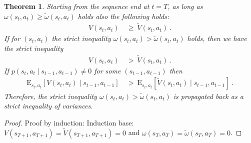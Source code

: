 \documentclass{article}
\newtheorem{theoremA}{Theorem}
\newcommand\EXP{\mathbf{\mathrm{E}}}
\renewcommand{\geq}{\geqslant}
\begin{document}
\begin{appendices}
\begin{theoremA}
Starting from the sequence end at $t=T$,
as long as $\omega(s_t,a_t) \geq \tilde{\omega}(s_t,a_t)$ holds also
the following holds:
\begin{align}
  V(s_t,a_t)  \ &\geq \  \widetilde{V}(s_t,a_t)   \ .
\end{align}
If for $(s_t,a_t)$ the strict inequality
$\omega(s_t,a_t) > \tilde{\omega}(s_t,a_t)$ 
holds, then we have the strict inequality
\begin{align}
  V(s_t,a_t)  \ &> \  \widetilde{V}(s_t,a_t)   \ .
\end{align}
If $p(s_t,a_t \mid s_{t-1},a_{t-1}) \not=0$ for some  $(s_{t-1},a_{t-1})$ then
\begin{align}
 \EXP_{s_t,a_t} \left[V(s_t,a_t)  \mid s_{t-1},a_{t-1} \right]  \ &> \ 
 \EXP_{s_t,a_t} \left[\widetilde{V}(s_t,a_t)  \mid s_{t-1},a_{t-1} \right]  \ .
\end{align}
Therefore, the strict inequality 
$\omega(s_t,a_t) > \tilde{\omega}(s_t,a_t)$ 
is propagated back as a strict inequality of variances.
\end{theoremA}

\begin{proof}
Proof by induction:
Induction base:  $V(s_{T+1},a_{T+1})  = \widetilde{V}(s_{T+1},a_{T+1})=0$ and
$\omega(s_T,a_T) = \tilde{\omega}(s_T,a_T)=0$.


\end{proof}
\end{appendices}
\end{document}
